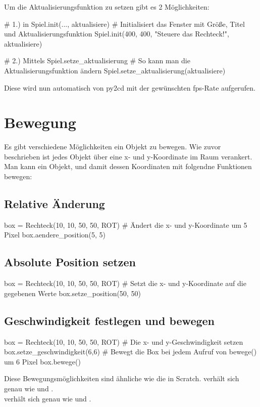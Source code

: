 \documentclass{\VorlagenPfad/coderdojokatext}
\begin{document}
Um die Aktualisierungsfunktion zu setzen gibt es 2 Möglichkeiten:
\begin{pythoncode}
# 1.) in Spiel.init(..., aktualisiere)
# Initialisiert das Fenster mit Größe, Titel und Aktualisierungsfunktion
Spiel.init(400, 400, "Steuere das Rechteck!", aktualisiere)

# 2.) Mittels Spiel.setze_aktualisierung
# So kann man die Aktualisierungsfunktion ändern
Spiel.setze_aktualisierung(aktualisiere)
\end{pythoncode}
Diese wird nun automatisch von py2cd mit der gewünschten fps-Rate aufgerufen.

\section{Bewegung}
Es gibt verschiedene Möglichkeiten ein Objekt zu bewegen. Wie zuvor beschrieben ist jedes Objekt über eine x- und y-Koordinate im Raum verankert. Man kann ein Objekt, und damit dessen Koordinaten mit folgendne Funktionen bewegen:

\subsection{Relative Änderung}
\begin{pythoncode}
box = Rechteck(10, 10, 50, 50, ROT)
# Ändert die x- und y-Koordinate um 5 Pixel
box.aendere_position(5, 5)
\end{pythoncode}

\subsection{Absolute Position setzen}
\begin{pythoncode}
box = Rechteck(10, 10, 50, 50, ROT)
# Setzt die x- und y-Koordinate auf die gegebenen Werte
box.setze_position(50, 50)
\end{pythoncode}

\subsection{Geschwindigkeit festlegen und bewegen}
\begin{pythoncode}
box = Rechteck(10, 10, 50, 50, ROT)
# Die x- und y-Geschwindigkeit setzen
box.setze_geschwindigkeit(6,6)
# Bewegt die Box bei jedem Aufruf von bewege() um 6 Pixel
box.bewege()
\end{pythoncode}

Diese Bewegungsmöglichkeiten sind ähnliche wie die in Scratch.  verhält sich genau wie  und .
\\
 verhält sich genau wie  und .
\end{document}

